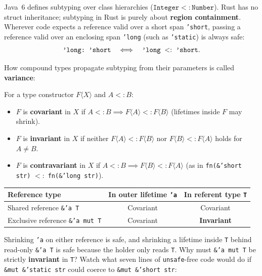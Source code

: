 Java~6 defines subtyping over class hierarchies ($\texttt{Integer} <: \texttt{Number}$). Rust has no struct inheritance; subtyping in Rust is purely about \textbf{region containment}. Wherever code expects a reference valid over a short span \texttt{'short}, passing a reference valid over an enclosing span \texttt{'long} (such as \texttt{'static}) is always safe:
\[
  \text{\texttt{'long:\ 'short}} \quad\Longleftrightarrow\quad \text{\texttt{'long}} \;<:\; \text{\texttt{'short}}.
\]

How compound types propagate subtyping from their parameters is called \textbf{variance}:

\begin{definition}
\label{ch04:def-variance}
For a type constructor $F\langle X \rangle$ and $A <: B$:
\begin{itemize}
  \item $F$ is \textbf{covariant} in $X$ if $A <: B \implies F\langle A \rangle <: F\langle B \rangle$ (lifetimes inside $F$ may shrink).
  \item $F$ is \textbf{invariant} in $X$ if neither $F\langle A \rangle <: F\langle B \rangle$ nor $F\langle B \rangle <: F\langle A \rangle$ holds for $A \neq B$.
  \item $F$ is \textbf{contravariant} in $X$ if $A <: B \implies F\langle B \rangle <: F\langle A \rangle$ (as in \texttt{fn(\&'short str)} $<:$ \texttt{fn(\&'long str)}).
\end{itemize}
\end{definition}

\begin{center}
\small
\begin{tabular}{@{}lcc@{}}
\toprule
\textbf{Reference type} & \textbf{In outer lifetime \texttt{'a}} & \textbf{In referent type \texttt{T}} \\
\midrule
Shared reference \texttt{\&'a T} & Covariant & Covariant \\
Exclusive reference \texttt{\&'a mut T} & Covariant & \textbf{Invariant} \\
\bottomrule
\end{tabular}
\end{center}

Shrinking \texttt{'a} on either reference is safe, and shrinking a lifetime inside \texttt{T} behind read-only \texttt{\&'a T} is safe because the holder only reads \texttt{T}. Why must \texttt{\&'a mut T} be strictly \textbf{invariant} in \texttt{T}? Watch what seven lines of \texttt{unsafe}-free code would do if \texttt{\&mut \&'static str} could coerce to \texttt{\&mut \&'short str}:

